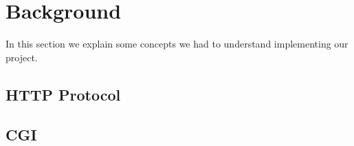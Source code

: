 \section*{Background}
In this section we explain some concepts we had to understand implementing our project. 

\subsection*{HTTP Protocol}

\subsection*{CGI}
